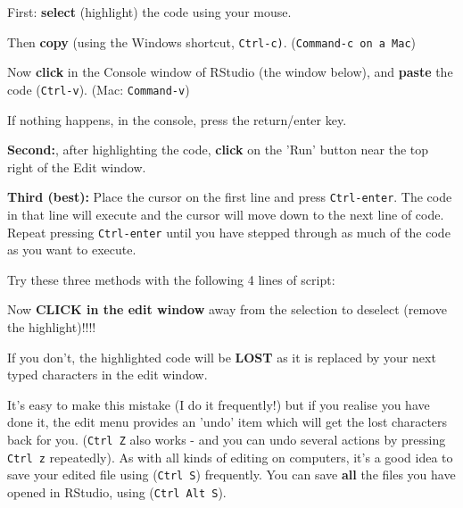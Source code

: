 \documentclass[titlepage]{book}\usepackage{knitr}
\begin{document}
First: \textbf{select} (highlight) the code using your mouse.

Then \textbf{copy} (using the Windows shortcut, \texttt{Ctrl-c)}. (\texttt{Command-c on a Mac})

Now \textbf{click} in the Console window of RStudio (the window below), and \textbf{paste} the code (\texttt{Ctrl-v}). (Mac: \texttt{Command-v})

If nothing happens, in the console, press the return/enter key.

\textbf{Second:}, after highlighting the code, \textbf{click} on the 'Run' button near the top right of the Edit window.

\textbf{Third (best):} Place the cursor on the first line and press \texttt{Ctrl-enter}. The code in that line will execute and the cursor will move down to the next line of code. Repeat pressing \texttt{Ctrl-enter} until you have stepped through as much of the code as you want to execute.

Try these three methods with the following 4 lines of script:

\begin{knitrout}
\color{fgcolor}\begin{kframe}
\begin{alltt}
  \hlcom{#-----------------------------------------------------------------------------------}
\hlstd{(}\hlstd{)}  
 \hlkwb{<-} \hlstd{(}\hlstd{))}   
         
          
\hlcom{#----------------------------------------------------------------------------------}
\end{alltt}
\end{kframe}
\end{knitrout}

  Now \textbf{CLICK in the edit window} away from the selection to deselect (remove the highlight)!!!!

  If you don't, the highlighted code will be \textbf{LOST} as it is replaced by your next typed characters in the edit window.

It's easy to make this mistake (I do it frequently!) but if you realise you have done it, the edit menu provides an 'undo' item which will get the lost characters back for you. (\texttt{Ctrl Z} also works - and you can undo several actions by pressing \texttt{Ctrl z} repeatedly). As with all kinds of editing on computers, it's a good idea to save your edited file using (\texttt{Ctrl S}) frequently. You can save \textbf{all} the files you have opened in RStudio, using (\texttt{Ctrl Alt S}).
\end{document}
